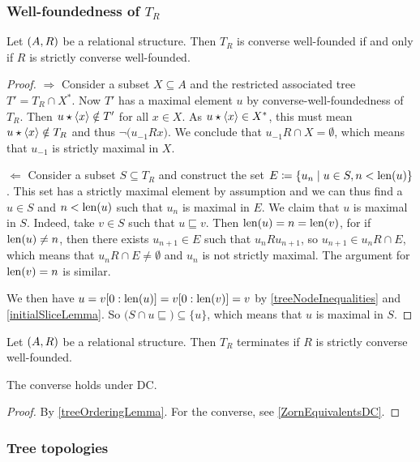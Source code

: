 \subsubsection{Well-foundedness of $T_R$}
\begin{proposition}
Let $\left( A, R \right)$ be a relational structure. Then $T_R$ is converse well-founded \textup{if and only if} $R$ is strictly converse well-founded.
\end{proposition}
\begin{proof}
$\boxed{\Rightarrow}$ Consider a subset $X\subseteq A$ and the restricted associated tree $T' = T_R\cap{X^*}$. Now $T'$ has a maximal element $u$ by converse-well-foundedness of $T_R$. Then $u\star\left\langle x \right\rangle \notin T'$ for all $x\in X$. As $u\star\left\langle x \right\rangle \in X^*$, this must mean $u\star\left\langle x \right\rangle\notin T_R$ and thus $\neg\big(u_{-1}Rx\big)$. We conclude that $u_{-1}R\cap X = \emptyset$, which means that $u_{-1}$ is strictly maximal in $X$.

$\boxed{\Leftarrow}$ Consider a subset $S\subseteq T_R$ and construct the set $E \coloneqq \left\{ u_n \;\middle|\; u\in S, n<\operatorname{len}(u) \right\}$. This set has a strictly maximal element by assumption and we can thus find a $u\in S$ and $n<\operatorname{len}(u)$ such that $u_{n}$ is maximal in $E$. We claim that $u$ is maximal in $S$. Indeed, take $v\in S$ such that $u\sqsubseteq v$. Then $\operatorname{len}(u) = n = \operatorname{len}(v)$, for if $\operatorname{len}(u) \neq n$, then there exists $u_{n+1}\in E$ such that $u_nRu_{n+1}$, so $u_{n+1}\in u_nR\cap E$, which means that $u_nR\cap E\neq \emptyset$ and $u_n$ is not strictly maximal. The argument for $\operatorname{len}(v) = n$ is similar.

We then have $u = v[0:\operatorname{len}(u)] = v[0:\operatorname{len}(v)] = v$ by \ref{treeNodeInequalities} and \ref{initialSliceLemma}. So $\big(S\cap u{\sqsubseteq}\big) \subseteq \{u\}$, which means that $u$ is maximal in $S$.
\end{proof}
\begin{corollary} \label{welfoundedACC}
Let $\left( A, R \right)$ be a relational structure. Then $T_R$ terminates if $R$ is strictly converse well-founded.

The converse holds under DC.
\end{corollary}
\begin{proof}
By \ref{treeOrderingLemma}. For the converse, see \ref{ZornEquivalentsDC}.
\end{proof}

\subsubsection{Tree topologies}

